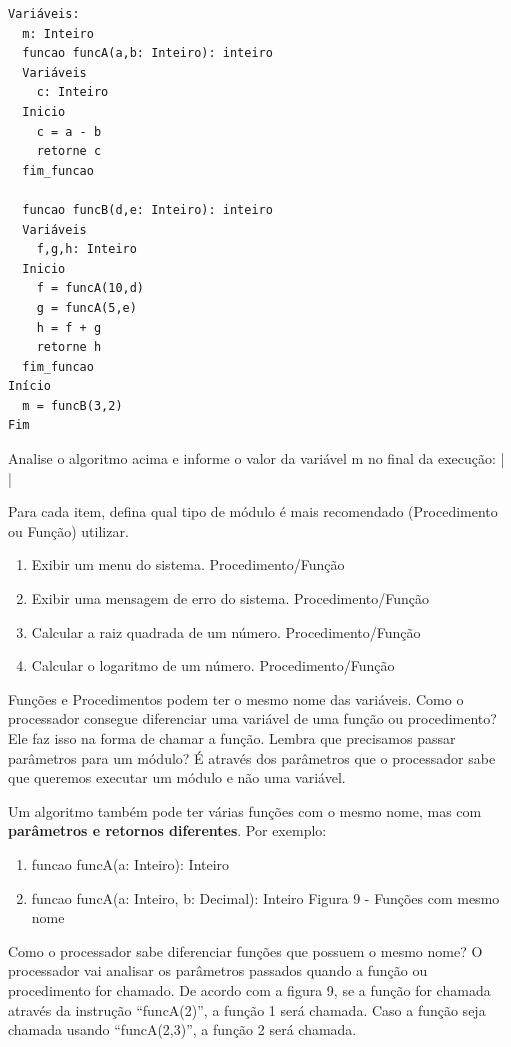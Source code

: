 \documentclass[11pt]{article}
\begin{document}
\begin{verbatim}
Variáveis:
  m: Inteiro
  funcao funcA(a,b: Inteiro): inteiro
  Variáveis
    c: Inteiro
  Inicio
    c = a - b
    retorne c
  fim_funcao

  funcao funcB(d,e: Inteiro): inteiro
  Variáveis
    f,g,h: Inteiro
  Inicio
    f = funcA(10,d)
    g = funcA(5,e)
    h = f + g
    retorne h
  fim_funcao
Início
  m = funcB(3,2)
Fim
\end{verbatim}

Analise o algoritmo acima e informe o valor da variável m no final da execução: |         |

Para cada item, defina qual tipo de módulo é mais recomendado (Procedimento ou Função) utilizar.

\begin{enumerate}
\item Exibir um menu do sistema.
Procedimento/Função

\item Exibir uma mensagem de erro do sistema.
Procedimento/Função

\item Calcular a raiz quadrada de um número.
Procedimento/Função

\item Calcular o logaritmo de um número.
Procedimento/Função
\end{enumerate}

Funções e Procedimentos podem ter o mesmo nome das variáveis. Como o processador consegue diferenciar uma variável de uma função ou procedimento? Ele faz isso na forma de chamar a função. Lembra que precisamos passar parâmetros para um módulo? É através dos parâmetros que o processador sabe que queremos executar um módulo e não uma variável.

Um algoritmo também pode ter várias funções com o mesmo nome, mas com \textbf{parâmetros e retornos diferentes}. Por exemplo:

\begin{enumerate}
\item funcao funcA(a: Inteiro): Inteiro
\item funcao funcA(a: Inteiro, b: Decimal): Inteiro
Figura 9 - Funções com mesmo nome
\end{enumerate}

Como o processador sabe diferenciar funções que possuem o mesmo nome? O processador vai analisar os parâmetros passados quando a função ou procedimento for chamado. De acordo com a figura 9, se a função for chamada através da instrução “funcA(2)”, a função 1 será chamada. Caso a função seja chamada usando “funcA(2,3)”, a função 2 será chamada.
\end{document}
